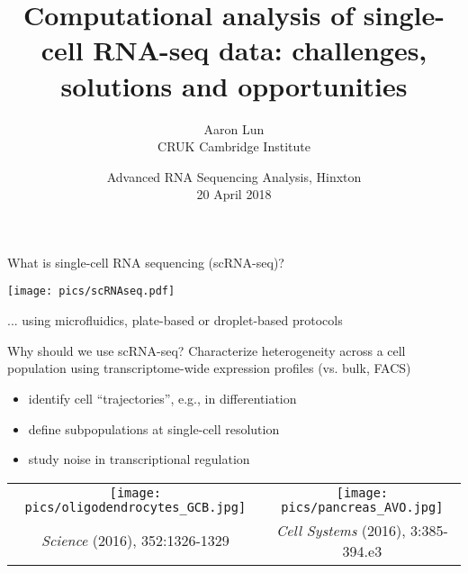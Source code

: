 \documentclass{beamer}
\title{Computational analysis of single-cell RNA-seq data: 
challenges, solutions and opportunities}
\author{Aaron Lun \\[0.1in]
\footnotesize{CRUK Cambridge Institute}
}
\date{
\footnotesize{Advanced RNA Sequencing Analysis, Hinxton}\\[0.1in]
20 April 2018
}
\begin{document}
\maketitle

\begin{frame}{What is single-cell RNA sequencing (scRNA-seq)?}
\begin{center}
    \texttt{[image: pics/scRNAseq.pdf]}
\end{center}
... using microfluidics, plate-based or droplet-based protocols
\end{frame}

\begin{frame}{Why should we use scRNA-seq?}
    \vspace{0.1in}
    Characterize heterogeneity across a cell population using transcriptome-wide expression profiles (vs. bulk, FACS) \\[0.5em]
\begin{itemize}
    \setlength\itemsep{0.5em}
    \item identify cell ``trajectories'', e.g., in differentiation
    \item define subpopulations at single-cell resolution
    \item study noise in transcriptional regulation
\end{itemize}
\pause
\begin{center}
    \begin{tabular}{c c}
        \texttt{[image: pics/oligodendrocytes\_GCB.jpg]} &
        \texttt{[image: pics/pancreas\_AVO.jpg]} \\
        {\tiny \textit{Science} (2016), 352:1326-1329} &
        {\tiny \textit{Cell Systems} (2016), 3:385-394.e3} \\
\end{tabular}
\end{center}
\end{frame}
\end{document}
